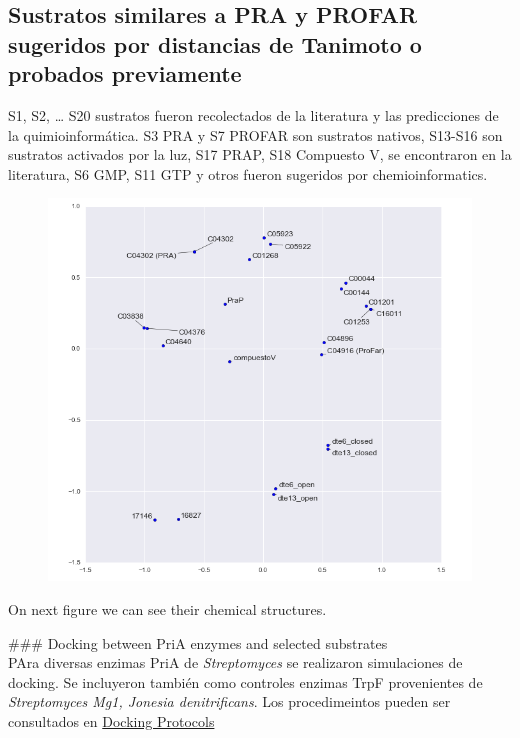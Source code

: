 \documentclass[12pt,twoside]{reedthesis}
\begin{document}
  \clearpage  
  
  \subsection{Sustratos similares a PRA y PROFAR sugeridos por distancias
  de Tanimoto o probados
  previamente}\label{sustratos-similares-a-pra-y-profar-sugeridos-por-distancias-de-tanimoto-o-probados-previamente}
  
  S1, S2, \ldots{} S20 sustratos fueron recolectados de la literatura y
  las predicciones de la quimioinformática. S3 PRA y S7 PROFAR son
  sustratos nativos, S13-S16 son sustratos activados por la luz, S17 PRAP,
  S18 Compuesto V, se encontraron en la literatura, S6 GMP, S11 GTP y
  otros fueron sugeridos por chemioinformatics.
  
  \begin{figure}[h!tbp]
  \centering
  \includegraphics[angle = 0,scale = 0.6]{chapter4/SubstratesClustering.png}
  \caption[Substrates clustering according to Tanimoto distance]{\footnotesize{}}
  \label{fig:tanimoto}
  \end{figure}
  
  On next figure we can see their chemical structures.
  
  \clearpage    \#\#\# Docking between PriA enzymes and selected
  substrates\\
  PAra diversas enzimas PriA de \emph{Streptomyces} se realizaron
  simulaciones de docking. Se incluyeron también como controles enzimas
  TrpF provenientes de \emph{Streptomyces Mg1, Jonesia denitrificans}. Los
  procedimeintos pueden ser consultados en
  \href{https://github.com/tripplab/Docking/wiki}{Docking Protocols}
  
\end{document}
